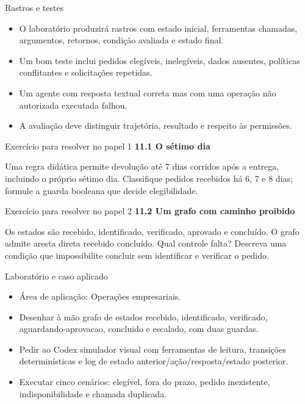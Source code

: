 \documentclass[10pt,aspectratio=169]{beamer}
\begin{document}
\begin{frame}[t]{Rastros e testes}
\small
\begin{itemize}
\item O laboratório produzirá rastros com estado inicial, ferramentas chamadas, argumentos, retornos, condição avaliada e estado final.
\item Um bom teste inclui pedidos elegíveis, inelegíveis, dados ausentes, políticas conflitantes e solicitações repetidas.
\item Um agente com resposta textual correta mas com uma operação não autorizada executada falhou.
\item A avaliação deve distinguir trajetória, resultado e respeito às permissões.
\end{itemize}
\end{frame}

\begin{frame}[t]{Exercício para resolver no papel 1}
\small
\small\textbf{11.1 O sétimo dia}\par\vspace{4mm}Uma regra didática permite devolução até 7 dias corridos após a entrega, incluindo o próprio sétimo dia. Classifique pedidos recebidos há 6, 7 e 8 dias; formule a guarda booleana que decide elegibilidade.
\end{frame}

\begin{frame}[t]{Exercício para resolver no papel 2}
\small
\small\textbf{11.2 Um grafo com caminho proibido}\par\vspace{4mm}Os estados são recebido, identificado, verificado, aprovado e concluído. O grafo admite aresta direta recebido concluído. Qual controle falta? Descreva uma condição que impossibilite concluir sem identificar e verificar o pedido.
\end{frame}

\begin{frame}[t]{Laboratório e caso aplicado}
\small
\begin{itemize}
\item Área de aplicação: Operações empresariais.
\item Desenhar à mão grafo de estados recebido, identificado, verificado, aguardando-aprovacao, concluido e escalado, com duas guardas.
\item Pedir ao Codex simulador visual com ferramentas de leitura, transições determinísticas e log de estado anterior/ação/resposta/estado posterior.
\item Executar cinco cenários: elegível, fora do prazo, pedido inexistente, indisponibilidade e chamada duplicada.
\end{itemize}
\end{frame}
\end{document}
